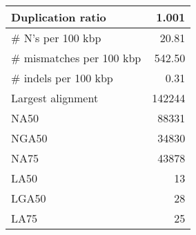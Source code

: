 \documentclass[12pt,a4paper]{article}
\begin{document}
\begin{table}[ht]
\begin{center}
\begin{tabular}{|l*{1}{|r}|}
Duplication ratio & 1.001 \\ \hline
\# N's per 100 kbp & 20.81 \\ \hline
\# mismatches per 100 kbp & 542.50 \\ \hline
\# indels per 100 kbp & 0.31 \\ \hline
Largest alignment & 142244 \\ \hline
NA50 & 88331 \\ \hline
NGA50 & 34830 \\ \hline
NA75 & 43878 \\ \hline
LA50 & 13 \\ \hline
LGA50 & 28 \\ \hline
LA75 & 25 \\ \hline
\end{tabular}
\end{center}
\end{table}
\end{document}
